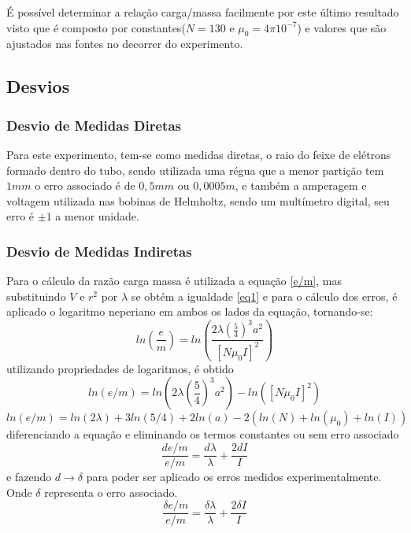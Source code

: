 É possível determinar a relação carga/massa facilmente por este último resultado visto que é composto por constantes($N=130$ e $\mu _0 =4\pi 10^{-7}$) e valores que são ajustados nas fontes no decorrer do experimento.
\subsection{Desvios}
  \subsubsection{Desvio de Medidas Diretas}
  Para este experimento, tem-se como medidas diretas, o raio do feixe de elétrons formado dentro do tubo, sendo utilizada uma régua que a menor partição tem $1mm$ o erro associado é de $0,5mm$ ou $0,0005m$, e também a amperagem e voltagem utilizada nas bobinas de Helmholtz, sendo um multímetro digital, seu erro é $\pm 1$ a menor unidade.
  \subsubsection{Desvio de Medidas Indiretas}
  Para o cálculo da razão carga massa é utilizada a equação \ref{e/m}, mas substituindo $V$ e $r^2$ por $\lambda$ se obtém a igualdade \ref{eq1} e para o cálculo dos erros, é aplicado o logaritmo neperiano em ambos os lados da equação, tornando-se:
  \begin{equation}
      ln\left(\frac{e}{m}\right)=ln\left(\frac{2\lambda\left(\frac{5}{4}\right)^3a^2}{[N\mu _0 I]^2}\right)
  \end{equation}
   utilizando propriedades de logaritmos, é obtido
  \begin{equation}
      ln(e/m)=ln\left(2\lambda\left(\frac{5}{4}\right)^3a^2\right)-ln\left([N\mu _0 I]^2\right)
  \end{equation}
  \begin{equation}
      ln(e/m)=ln(2\lambda)+3ln(5/4)+2ln(a)-2(ln(N)+ln(\mu _0)+ln(I))
  \end{equation}
  diferenciando a equação e eliminando os termos constantes ou sem erro associado
  \begin{equation}
      \frac{de/m}{e/m}=\frac{d\lambda}{\lambda} + \frac{2dI}{I}
  \end{equation}
  e fazendo $d\rightarrow \delta$ para poder ser aplicado os erros medidos experimentalmente. Onde $\delta$ representa o erro associado.
  \begin{equation}
      \frac{\delta e/m}{e/m}=\frac{\delta\lambda}{\lambda} + \frac{2\delta I}{I}
  \label{eq:err}
  \end{equation}

